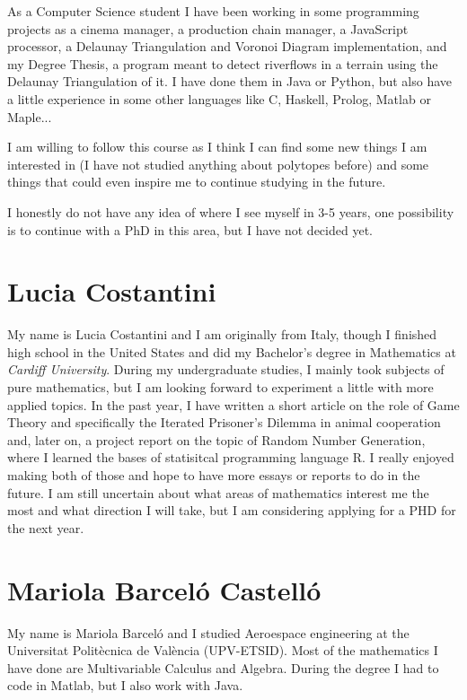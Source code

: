 \documentclass[11pt]{amsart}
\begin{document}
As a Computer Science student I have been working in some programming projects as a cinema manager, a production chain manager, a JavaScript processor, a Delaunay Triangulation and Voronoi Diagram implementation, and my Degree Thesis, a program meant to detect riverflows in a terrain using the Delaunay Triangulation of it. I have done them in Java or Python, but also have a little experience in some other languages like C, Haskell, Prolog, Matlab or Maple...

I am willing to follow this course as I think I can find some new things I am interested in (I have not studied anything about polytopes before) and some things that could even inspire me to continue studying in the future.

I honestly do not have any idea of where I see myself in 3-5 years, one possibility is to continue with a PhD in this area, but I have not decided yet.

\medskip

\section*{Lucia Costantini}

My name is Lucia Costantini and I am originally from Italy, though I finished high school in the United States and did my Bachelor's degree in Mathematics at \textit{Cardiff University}.
During my undergraduate studies, I mainly took subjects of pure mathematics, but I am looking forward to experiment a little with more applied topics. 
In the past year, I have written a short article on the role of Game Theory and specifically the Iterated Prisoner's Dilemma in animal cooperation and, later on, a project report on the topic of Random Number Generation, where I learned the bases of statisitcal programming language R. 
I really enjoyed making both of those and hope to have more essays or reports to do in the future.
I am still uncertain about what areas of mathematics interest me the most and what direction I will take, but I am considering applying for a PHD for the next year.

\medskip

\section*{Mariola Barceló Castelló}

My name is Mariola Barceló
and I studied Aeroespace engineering at
the Universitat Politècnica de València (UPV-ETSID).
Most of the mathematics I have done are Multivariable Calculus and Algebra.
During the degree I had to code in Matlab,
 but I also work with Java.
\end{document}
